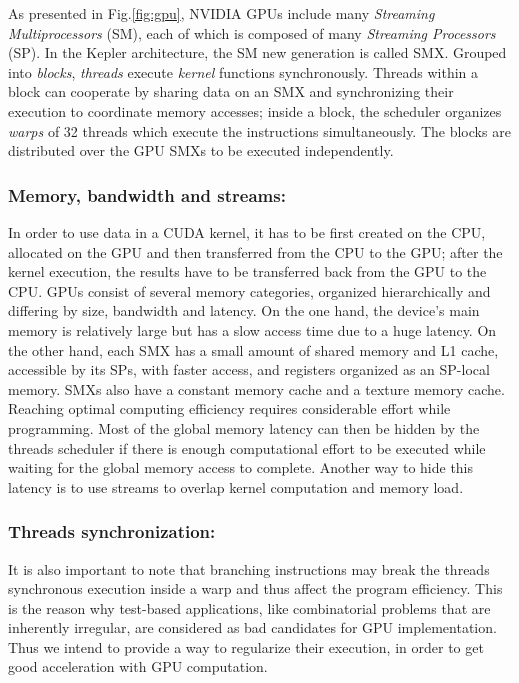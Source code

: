 As presented in Fig.\ref{fig:gpu}, NVIDIA GPUs include many \emph{Streaming Multiprocessors} (SM), each of which is composed of many \emph{Streaming Processors} (SP). In the Kepler architecture, the SM new generation is called SMX.
%
Grouped into \emph{blocks}, \textit{threads} execute \emph{kernel} functions synchronously.
Threads within a block can cooperate by sharing data on an SMX and synchronizing their execution to coordinate memory accesses; inside a block, the scheduler organizes \emph{warps} of 32 threads which execute the instructions simultaneously.
The blocks are distributed over the GPU SMXs to be executed independently.

\subsubsection{Memory, bandwidth and streams:}

In order to use data in a CUDA kernel, it has to be first created on the CPU, allocated on the GPU and then transferred from the CPU to the GPU; after the kernel execution, the results have to be transferred back from the GPU to the CPU. 
GPUs consist of several memory categories, organized hierarchically and differing by size, bandwidth and latency.   
On the one hand, the device's main memory is relatively large but has a slow access time due to a huge latency. 
On the other hand, each SMX has a small amount of shared memory and L1 cache, accessible by its SPs, with faster access, and registers organized as an SP-local memory. 
SMXs also have a constant memory cache and a texture memory cache.
Reaching optimal computing efficiency requires considerable effort while programming.
Most of the global memory latency can then be hidden by the threads scheduler if there is enough computational effort to be executed while waiting for the global memory access to complete. Another way to hide this latency is to use streams to overlap kernel computation and memory load. 

\subsubsection{Threads synchronization:}
It is also important to note that branching instructions may break the threads synchronous execution inside a warp and thus affect the program efficiency. 
This is the reason why test-based applications, like combinatorial problems that are inherently irregular, are considered as bad candidates for GPU implementation. 
Thus we intend to provide a way to regularize their execution, in order to get good acceleration with GPU computation. 

